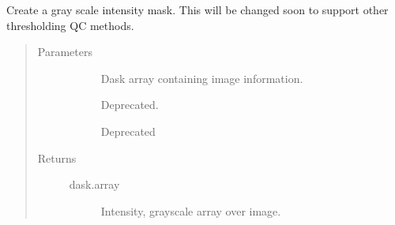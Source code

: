 \documentclass[letterpaper,10pt,english]{sphinxmanual}
\begin{document}

\begin{fulllineitems}
\label{\detokenize{index:pathflowai.utils.create_purple_mask}}
Create a gray scale intensity mask. This will be changed soon to support other thresholding QC methods.
\begin{quote}\begin{description}
\item[{Parameters}] \leavevmode\begin{description}
\item[{}] \leavevmode
Dask array containing image information.

\item[{}] \leavevmode
Deprecated.

\item[{}] \leavevmode
Deprecated

\end{description}

\item[{Returns}] \leavevmode\begin{description}
\item[{dask.array}] \leavevmode
Intensity, grayscale array over image.

\end{description}

\end{description}\end{quote}

\end{fulllineitems}

\end{document}
